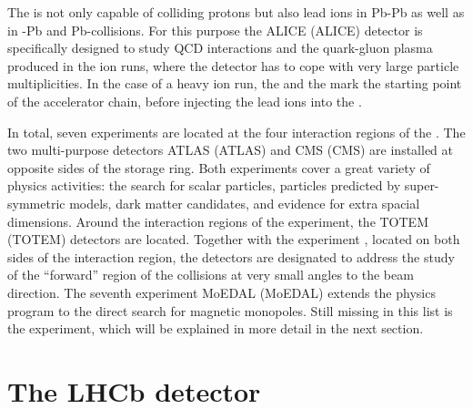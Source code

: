 The \LHC is not only capable of colliding protons but also lead ions in Pb-Pb as
well as in \proton-Pb and Pb-\proton collisions. For this purpose the
\acs{ALICE} (\acl{ALICE}) detector \cite{Aamodt:2008zz} is specifically designed
to study QCD interactions and the quark-gluon plasma produced in the \LHC ion
runs, where the detector has to cope with very large particle multiplicities. In
the case of a heavy ion run, the \LINACThree and the \LEIR mark the starting
point of the accelerator chain, before injecting the lead ions into the \PSyn.

In total, seven experiments are located at the four interaction regions of the
\LHC. The two multi-purpose detectors \acs{ATLAS} (\acl{ATLAS})
\cite{Aad:2008zzm} and \acs{CMS} (\acl{CMS}) \cite{Chatrchyan:2008aa} are
installed at opposite sides of the storage ring. Both experiments cover a great
variety of physics activities: the search for scalar particles, particles
predicted by super-symmetric models, dark matter candidates, and evidence for
extra spacial dimensions. Around the interaction regions of the \CMS experiment,
the \acs{TOTEM} (\acl{TOTEM}) detectors \cite{Anelli:2008zza} are located.
Together with the \LHCf experiment \cite{Adriani:2008zz}, located on both sides
of the \ATLAS interaction region, the detectors are designated to address the
study of the \enquote{forward} region of the collisions at very small angles to
the beam direction. The seventh experiment \acs{MoEDAL} (\acl{MoEDAL})
\cite{Acharya:2014nyr} extends the \LHC physics program to the direct search for
magnetic monopoles. Still missing in this list is the \LHCb experiment, which
will be explained in more detail in the next section.


\section{The LHCb detector}
\label{sec:lhcb_experiment:detector}

